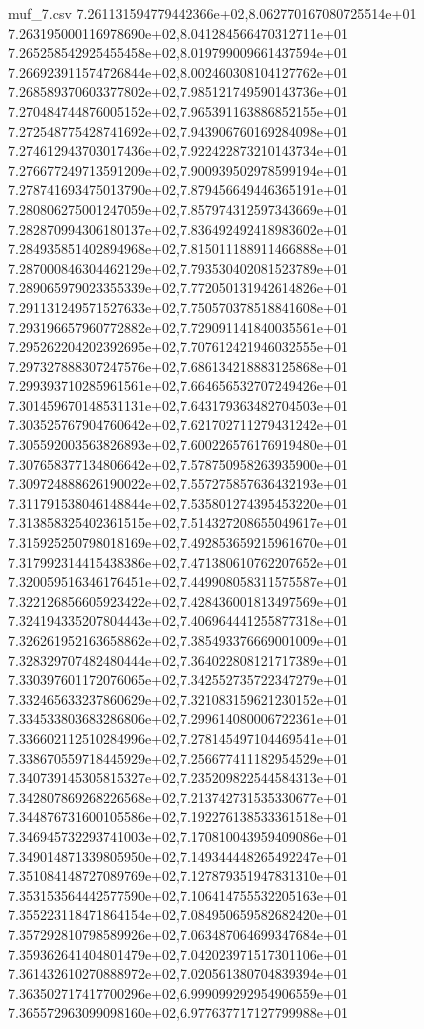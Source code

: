 \begin{filecontents*}{muf_7.csv}
7.261131594779442366e+02,8.062770167080725514e+01
7.263195000116978690e+02,8.041284566470312711e+01
7.265258542925455458e+02,8.019799009661437594e+01
7.266923911574726844e+02,8.002460308104127762e+01
7.268589370603377802e+02,7.985121749590143736e+01
7.270484744876005152e+02,7.965391163886852155e+01
7.272548775428741692e+02,7.943906760169284098e+01
7.274612943703017436e+02,7.922422873210143734e+01
7.276677249713591209e+02,7.900939502978599194e+01
7.278741693475013790e+02,7.879456649446365191e+01
7.280806275001247059e+02,7.857974312597343669e+01
7.282870994306180137e+02,7.836492492418983602e+01
7.284935851402894968e+02,7.815011188911466888e+01
7.287000846304462129e+02,7.793530402081523789e+01
7.289065979023355339e+02,7.772050131942614826e+01
7.291131249571527633e+02,7.750570378518841608e+01
7.293196657960772882e+02,7.729091141840035561e+01
7.295262204202392695e+02,7.707612421946032555e+01
7.297327888307247576e+02,7.686134218883125868e+01
7.299393710285961561e+02,7.664656532707249426e+01
7.301459670148531131e+02,7.643179363482704503e+01
7.303525767904760642e+02,7.621702711279431242e+01
7.305592003563826893e+02,7.600226576176919480e+01
7.307658377134806642e+02,7.578750958263935900e+01
7.309724888626190022e+02,7.557275857636432193e+01
7.311791538046148844e+02,7.535801274395453220e+01
7.313858325402361515e+02,7.514327208655049617e+01
7.315925250798018169e+02,7.492853659215961670e+01
7.317992314415438386e+02,7.471380610762207652e+01
7.320059516346176451e+02,7.449908058311575587e+01
7.322126856605923422e+02,7.428436001813497569e+01
7.324194335207804443e+02,7.406964441255877318e+01
7.326261952163658862e+02,7.385493376669001009e+01
7.328329707482480444e+02,7.364022808121717389e+01
7.330397601172076065e+02,7.342552735722347279e+01
7.332465633237860629e+02,7.321083159621230152e+01
7.334533803683286806e+02,7.299614080006722361e+01
7.336602112510284996e+02,7.278145497104469541e+01
7.338670559718445929e+02,7.256677411182954529e+01
7.340739145305815327e+02,7.235209822544584313e+01
7.342807869268226568e+02,7.213742731535330677e+01
7.344876731600105586e+02,7.192276138533361518e+01
7.346945732293741003e+02,7.170810043959409086e+01
7.349014871339805950e+02,7.149344448265492247e+01
7.351084148727089769e+02,7.127879351947831310e+01
7.353153564442577590e+02,7.106414755532205163e+01
7.355223118471864154e+02,7.084950659582682420e+01
7.357292810798589926e+02,7.063487064699347684e+01
7.359362641404801479e+02,7.042023971517301106e+01
7.361432610270888972e+02,7.020561380704839394e+01
7.363502717417700296e+02,6.999099292954906559e+01
7.365572963099098160e+02,6.977637717127799988e+01

\end{filecontents*}
